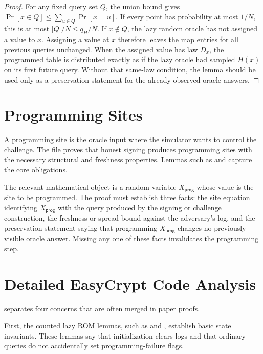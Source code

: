 \begin{proof}
For any fixed query set \(Q\), the union bound gives
\(\Pr[x\in Q]\le \sum_{u\in Q}\Pr[x=u]\).  If every point has probability at
most \(1/N\), this is at most \(|Q|/N\le q_H/N\).  If \(x\notin Q\), the lazy
random oracle has not assigned a value to \(x\).  Assigning a value at \(x\)
therefore leaves the map entries for all previous queries unchanged.  When the
assigned value has law \(D_x\), the programmed table is distributed exactly as if
the lazy oracle had sampled \(H(x)\) on its first future query.  Without that
same-law condition, the lemma should be used only as a preservation statement for
the already observed oracle answers.
\end{proof}

\section{Programming Sites}

A programming site is the oracle input where the simulator wants to control the
challenge.  The file  proves that honest
signing produces programming sites with the necessary structural and freshness
properties.  Lemmas such as
 and
 capture the
core obligations.

The relevant mathematical object is a random variable \(X_{\mathsf{prog}}\)
whose value is the site to be programmed.  The proof must establish three facts:
the site equation identifying \(X_{\mathsf{prog}}\) with the query produced by
the signing or challenge construction, the freshness or spread bound against the
adversary's log, and the preservation statement saying that programming
\(X_{\mathsf{prog}}\) changes no previously visible oracle answer.  Missing any
one of these facts invalidates the programming step.

\section{Detailed EasyCrypt Code Analysis}

 separates four concerns that are often merged
in paper proofs.

First, the counted lazy ROM lemmas, such as
 and
, establish basic state
invariants.  These lemmas say that initialization clears logs and that ordinary
queries do not accidentally set programming-failure flags.


